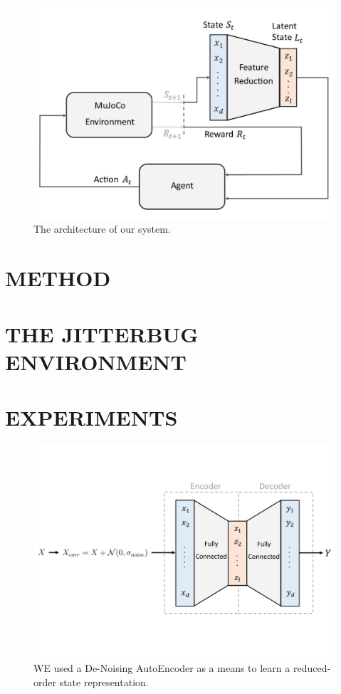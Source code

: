 \documentclass[letterpaper, 10 pt, conference]{ieeeconf}
\begin{document}
\begin{figure}[ht]
    \centering
    \includegraphics[width=\linewidth]{fig-system-arch}
    \caption{
        The architecture of our system.
    }
    \label{fig:system-arch}
\end{figure}

\section{METHOD}

\lipsum[1-9]

\section{THE JITTERBUG ENVIRONMENT}

\lipsum[1-9]

\section{EXPERIMENTS}

\begin{figure}[ht]
    \centering
    \includegraphics[width=\linewidth]{fig-autoencoder}
    \caption{
        WE used a De-Noising AutoEncoder as a means to learn a reduced-order state representation.
    }
    \label{fig:autoencoder}
\end{figure}
\end{document}
